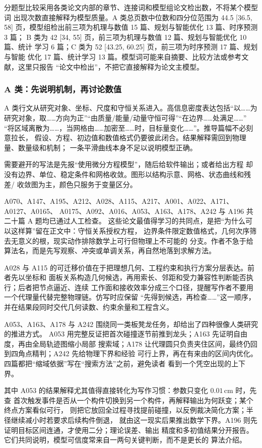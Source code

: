 \documentclass[UTF8,a4paper,12pt]{ctexart}
\begin{document}
分题型比较采用各类论文内部的章节、连接词和模型组论文检出数，不将某个模型词
出现次数直接解释为模型质量。A 类总页数中位数和四分位范围为 44.5 [36.5, 58]
页，模型组检出前三项为机理与数值 15 篇、规划与智能优化 13 篇、时序预测 3 篇；
B 类为 42 [34, 55] 页，前三项为机理与数值 12 篇、规划与智能优化 10 篇、统计
学习 6 篇；C 类为 52 [43.25, 60.25] 页，前三项为时序预测 17 篇、规划与智能
优化 17 篇、统计学习 13 篇。模型词可能来自摘要、比较方法或参考文献，这里只报告
“论文中检出”，不把它直接解释为论文主模型。

\subsubsection{A 类：先说明机制，再讨论数值}

A 类行文从研究对象、坐标、尺度和守恒关系进入。高信息密度表达包括“以……为
研究对象，取……方向为正”“由质量/能量/动量守恒可得”“在边界……处满足……”
“将区域离散为……，当网格由……加密至……时，目标量变化……”。推导篇幅不必刻意拉长，
假设、方程、初边值和数值格式仍要彼此闭合。结果解释需回到物理量、数量级和机制；
一条平滑曲线本身不足以说明模型正确。

需要避开的写法是先报“使用微分方程模型”，随后给软件输出；或者给出方程
却没有边界、单位、稳定条件和网格收敛。图形以结构示意、网格、状态曲线和残差/
收敛图为主，颜色只服务于变量区分。

A070、A147、A195、A212、A028、A115、A217、A001、A022、A171、A0127、A0165、
A0175、A092、A016、A053、A163、A178、A242 与 A196 共二十篇 A 题均已通过人工检查。
这些论文最值得学习的共同点，是把“为什么可以这样算”留在正文中：守恒关系授权方程，
边界条件限定数值格式，几何次序筛去无意义的根，现实动作排除数学上可行但物理上不可能的
分支。作者不急于给算法名，而是先写观察、冲突或单调关系，再自然地落到求解方法。

A028 与 A115 的可迁移价值在于把理想几何、工程约束和执行方案分层表达。前者先以坐标和
面板关系构造几何候选，再用索长、邻距和受力兼容性判断能否执行；后者把节点逼近、连续
工作面和接收效率分成三个口径，提醒写作者不要用一个代理量代替完整物理链。仿写时应保留
“先得到候选，再检查……”这一顺序，并在结果段同时交代几何读数、约束余量和工程含义。

A053、A163、A178 与 A242 围绕同一类板凳龙任务，却给出了四种很像人类研究的推进方式。
A053 用完整反证把首次碰撞逐节前推到龙头；A163 先证明自由度，再由全局轨迹图缩小局部
搜索域；A178 让代理圆只负责夹住区间，最终仍回到四角点精判；A242 先给物理下界和经验
可行上界，再在有来由的区间内优化。四篇都把“缩域依据”写在“搜索方法”之前，避免读者
看到一个凭空出现的上下界。

其中 A053 的结果解释尤其值得直接转化为写作习惯：参数只变化 $0.01\,\mathrm{cm}$ 时，先查
首次触发事件是否从一个构件切换到另一个构件，再解释输出为何跃变；某个终点方案看似可行，
则把它放回全过程寻找提前碰撞，以反例裁决简化方案；半径继续减小时若要求后续构件倒退，
就由这一现实后果推出数学下界。A196 则先证明目标区间连通，才使用二分；理论误差、输出
精度和多初值结果分开报告。它们共同说明，模型可信度常来自一两句关键判断，而不是更长的
算法介绍。
\end{document}
